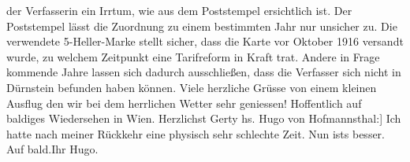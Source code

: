 \begin{ledgroupsized}[t]{13cm}
{{{                     der Verfasserin ein Irrtum, wie aus dem Poststempel ersichtlich ist. Der
                     Poststempel lässt die Zuordnung zu einem bestimmten Jahr nur unsicher zu. Die
                     verwendete 5-Heller-Marke stellt sicher, dass die Karte vor Oktober
                        1916 versandt wurde, zu welchem Zeitpunkt eine Tarifreform in Kraft
                     trat. Andere in Frage kommende Jahre lassen sich dadurch ausschließen, dass die
                     Verfasser sich nicht in Dürnstein befunden haben
                     können.}}}\label{K_L02225_1h}\pend
           \pstart
           Viele herzliche Grüsse von einem kleinen Ausflug den wir bei dem herrlichen Wetter
               sehr geniessen!\pend
           \pstart
           Hoffentlich auf baldiges Wiedersehen in Wien.\pend
           \pstart Herzlichst \spacefill\mbox{Gerty}\pend{}\pstart
           \noindent{}{[}hs. Hugo von Hofmannsthal:{]} Ich hatte nach meiner Rückkehr eine physisch sehr
               schlechte Zeit. Nun ists besser.\pend
           \pstart Auf bald.\hspace*{1.5em}Ihr \spacefill\mbox{Hugo.}\pend{}
         
         \endnumbering{}\end{ledgroupsized}  \newcommand{\dateiname}{L02225}\newcommand{\titel}{Gerty und Hugo von Hofmannsthal an Arthur und Olga Schnitzler, 5. 5. [1916?]}\newcommand{\editorInnen}{Martin Anton Müller und Gerd-Hermann Susen}
      